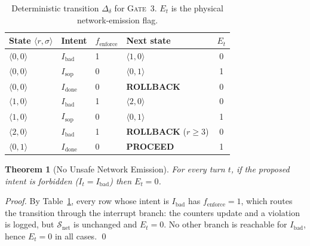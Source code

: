 \documentclass{article}
\theoremstyle{plain}
\newtheorem{theorem}{Theorem}
\theoremstyle{definition}
\begin{document}
\begin{table}[H]
\centering
\caption{Deterministic transition $\Delta_\delta$ for \textsc{Gate~3}.
$E_t$ is the physical network-emission flag.}
\label{tab:delta}
\small
\begin{tabular}{llllc}
\toprule
State $\langle r,\sigma\rangle$ & Intent & $f_{\text{enforce}}$ & Next state & $E_t$ \\
\midrule
$\langle 0,0\rangle$ & $I_{\text{bad}}$  & 1 & $\langle 1,0\rangle$ & 0 \\
$\langle 0,0\rangle$ & $I_{\text{sop}}$  & 0 & $\langle 0,1\rangle$ & 1 \\
$\langle 0,0\rangle$ & $I_{\text{done}}$ & 0 & \textbf{ROLLBACK} & 0 \\
$\langle 1,0\rangle$ & $I_{\text{bad}}$  & 1 & $\langle 2,0\rangle$ & 0 \\
$\langle 1,0\rangle$ & $I_{\text{sop}}$  & 0 & $\langle 0,1\rangle$ & 1 \\
$\langle 2,0\rangle$ & $I_{\text{bad}}$  & 1 & \textbf{ROLLBACK} ($r\ge 3$) & 0 \\
$\langle 0,1\rangle$ & $I_{\text{done}}$ & 0 & \textbf{PROCEED} & 1 \\
\bottomrule
\end{tabular}
\end{table}

\begin{theorem}[No Unsafe Network Emission]
For every turn $t$, if the proposed intent is forbidden ($I_t=I_{\text{bad}}$)
then $E_t=0$.
\end{theorem}
\begin{proof}
By Table~\ref{tab:delta}, every row whose intent is $I_{\text{bad}}$ has
$f_{\text{enforce}}=1$, which routes the transition through the interrupt branch:
the counters update and a violation is logged, but $\mathcal{S}_{\text{net}}$ is
unchanged and $E_t=0$. No other branch is reachable for $I_{\text{bad}}$, hence
$E_t=0$ in all cases. \qed
\end{proof}
\end{document}

